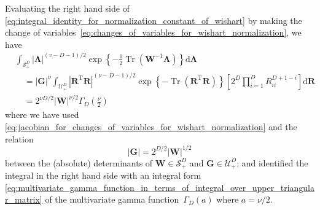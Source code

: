 \documentclass[12pt,a4paper]{article}
\begin{document}
Evaluating the right hand side of
\eqref{eq:integral_identity_for_normalization_constant_of_wishart}
by making the change of variables~\eqref{eq:changes_of_variables_for_wishart_normalization},
we have
\begin{align}
&\int_{\mathcal{S}_{+}^{D}}
\left| \bm{\Lambda} \right|^{(v - D - 1)/2}
\exp\left\{ -\frac{1}{2} \operatorname{Tr}\left(\mathbf{W}^{-1}\bm{\Lambda}\right) \right\}
\mathrm{d}\bm{\Lambda} \\
& \quad =
\left|\mathbf{G}\right|^{\nu}
\int_{\mathcal{U}_{+}^{D}}
\left| \mathbf{R}^{\operatorname{T}} \mathbf{R} \right|^{(\nu - D - 1)/2}
\exp\left\{ -\operatorname{Tr}\left( \mathbf{R}^{\operatorname{T}} \mathbf{R} \right) \right\}
\left[ 2^{D} \prod_{i=1}^{D} R_{ii}^{D + 1 - i} \right]
\mathrm{d}\mathbf{R} \\
& \quad =
2^{\nu D/2} \left| \mathbf{W} \right|^{\nu/2} \Gamma_{D}\left(\frac{\nu}{2}\right)
\end{align}
where we have used \eqref{eq:jacobian_for_changes_of_variables_for_wishart_normalization} and
the relation
\begin{equation}
\left|\mathbf{G}\right| = 2^{D/2} \left| \mathbf{W} \right|^{1/2}
\end{equation}
between the (absolute) determinants of
$\mathbf{W} \in \mathcal{S}_{+}^{D}$ and $\mathbf{G} \in \mathcal{U}_{+}^{D}$; and
identified the integral in the right hand side with an integral form~%
\eqref{eq:multivariate_gamma_function_in_terms_of_integral_over_upper_triangular_matrix}
of the multivariate gamma function~$\Gamma_D(a)$ where $a = \nu/2$.
\end{document}
